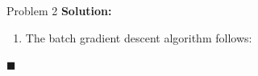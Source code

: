 \documentclass{article}
\newenvironment{solution}                               %
{\textbf{Solution:} }{$\blacksquare$}                   %
\begin{document}
\begin{section}{Problem 2}
\begin{solution}
\begin{enumerate}[label=(\alph*)]
                \item The batch gradient descent algorithm follows:\\
                \begin{algorithm}[H]
                    \DontPrintSemicolon
                \end{algorithm}
            \end{enumerate}
        \end{solution}
    \end{section}
\end{document}
